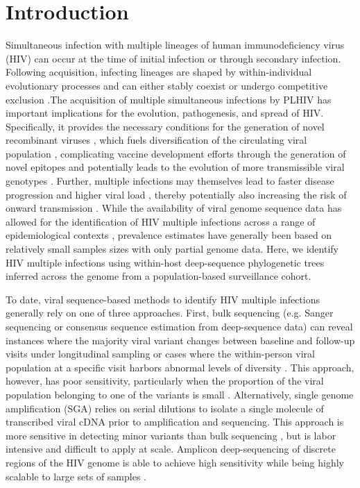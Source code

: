 \documentclass[10pt,letterpaper]{article}
\begin{document}
\section{Introduction}
Simultaneous infection with multiple lineages of human immunodeficiency virus (HIV) can occur at the time of initial infection \cite{kijak2017} or through secondary infection\cite{redd2013}. Following acquisition, infecting lineages are shaped by within-individual evolutionary processes and can either stably coexist or undergo competitive exclusion \cite{redd2012, wertheim2018}.The acquisition of multiple simultaneous infections by PLHIV has important implications for the evolution, pathogenesis, and spread of HIV. Specifically, it provides the necessary conditions for the generation of novel recombinant viruses \cite{shriner2004, song2018, streeck2008}, which fuels diversification of the circulating viral population \cite{ramirez2008, kim2024}, complicating vaccine development efforts through the generation of novel epitopes \cite{ritchie2014, corey2010} and potentially leads to the evolution of more transmissible viral genotypes \cite{kiwanuka2009}. Further, multiple infections may themselves lead to faster disease progression \cite{gottlieb2004, smith2004, ronen2014} and higher viral load \cite{janes2015, ronen2014, smith2004}, thereby potentially also increasing the risk of onward transmission \cite{quinn2000, fraser2007}. While the availability of viral genome sequence data has allowed for the identification of HIV multiple infections across a range of epidemiological contexts \cite{yuan2024}, prevalence estimates have generally been based on relatively small samples sizes with only partial genome data. Here, we identify HIV multiple infections using within-host deep-sequence phylogenetic trees inferred across the genome from a population-based surveillance cohort. \par

To date, viral sequence-based methods to identify HIV multiple infections generally rely on one of three approaches. First, bulk sequencing (e.g. Sanger  sequencing or consensus sequence estimation from deep-sequence data) can reveal instances where the majority viral variant changes between baseline and follow-up visits under longitudinal sampling or cases where the within-person viral population at a specific visit harbors abnormal levels of diversity \cite{smith2004, cornelissen2007, vanderkuyl2009, chaudron2022}. This approach, however, has poor sensitivity, particularly when the proportion of the viral population belonging to one of the variants is small \cite{rachinger2010}. Alternatively, single genome amplification (SGA) relies on serial dilutions to isolate a single molecule of transcribed viral cDNA prior to amplification and sequencing. This approach is more sensitive in detecting minor variants than bulk sequencing \cite{pacold2010, keele2008, abrahams2009, li2010, dwyer-lindgren2019}, but is labor intensive and difficult to apply at scale. Amplicon deep-sequencing of discrete regions of the HIV genome is able to achieve high sensitivity while being highly scalable to large sets of samples \cite{pacold2010, redd2011, redd2012, redd2014, ronen2013}. \par
\end{document}
